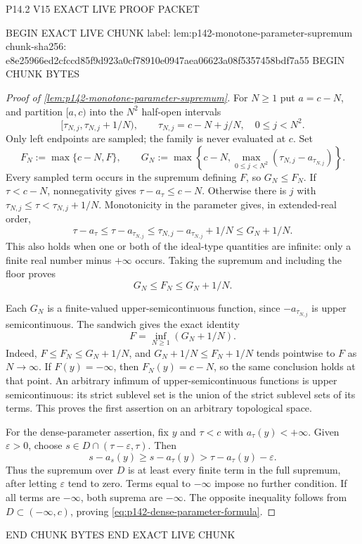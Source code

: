 P14.2 V15 EXACT LIVE PROOF PACKET

BEGIN EXACT LIVE CHUNK
label: lem:p142-monotone-parameter-supremum
chunk-sha256: e8e25966ed2cfccd85f9d923a0cf78910e0947aea06623a08f5357458bdf7a55
BEGIN CHUNK BYTES
\begin{proof}[Proof of \cref{lem:p142-monotone-parameter-supremum}]
For $N\geq1$ put $a=c-N$, and partition $[a,c)$ into the $N^2$
half-open intervals
\[
 [\tau_{N,j},\tau_{N,j}+1/N),\qquad
 \tau_{N,j}=c-N+j/N,\quad 0\leq j<N^2.
\]
Only left endpoints are sampled; the family is never evaluated at $c$.
Set
\[
 F_N:=\max\{c-N,F\},\qquad
 G_N:=\max\left\{c-N,
      \max_{0\leq j<N^2}
       (\tau_{N,j}-a_{\tau_{N,j}})\right\}.
\]
Every sampled term occurs in the supremum defining $F$, so $G_N\leq F_N$.
If $\tau<c-N$, nonnegativity gives $\tau-a_\tau\leq c-N$.
Otherwise there is $j$ with
$\tau_{N,j}\leq\tau<\tau_{N,j}+1/N$. Monotonicity in the parameter
gives, in extended-real order,
\[
 \tau-a_\tau
 \leq \tau-a_{\tau_{N,j}}
 \leq \tau_{N,j}-a_{\tau_{N,j}}+1/N
 \leq G_N+1/N.
\]
This also holds when one or both of the ideal-type quantities are infinite:
only a finite real number minus $+\infty$ occurs. Taking the supremum and
including the floor proves
\[
             G_N\leq F_N\leq G_N+1/N.
 \tag{71.33h}
 \label{eq:p142-grid-sandwich}
\]

Each $G_N$ is a finite-valued upper-semicontinuous function, since
$-a_{\tau_{N,j}}$ is upper semicontinuous. The sandwich gives the exact
identity
\[
                  F=\inf_{N\geq1}(G_N+1/N).
 \tag{71.33i}
 \label{eq:p142-usc-infimum}
\]
Indeed, $F\leq F_N\leq G_N+1/N$, and
$G_N+1/N\leq F_N+1/N$ tends pointwise to $F$ as $N\to\infty$.
If $F(y)=-\infty$, then $F_N(y)=c-N$, so the same conclusion holds
at that point. An arbitrary infimum of upper-semicontinuous functions is
upper semicontinuous: its strict sublevel set is the union of the strict
sublevel sets of its terms. This proves the first assertion on an
arbitrary topological space.

For the dense-parameter assertion, fix $y$ and $\tau<c$ with
$a_\tau(y)<+\infty$. Given $\varepsilon>0$, choose
$s\in D\cap(\tau-\varepsilon,\tau)$. Then
\[
 s-a_s(y)\geq s-a_\tau(y)
              >\tau-a_\tau(y)-\varepsilon.
\]
Thus the supremum over $D$ is at least every finite term in the full
supremum, after letting $\varepsilon$ tend to zero. Terms equal to
$-\infty$ impose no further condition. If all terms are $-\infty$,
both suprema are $-\infty$. The opposite inequality follows from
$D\subset(-\infty,c)$, proving
\eqref{eq:p142-dense-parameter-formula}.
\end{proof}
END CHUNK BYTES
END EXACT LIVE CHUNK

